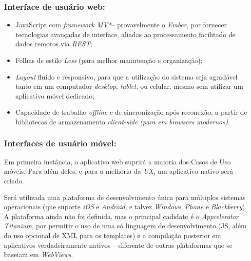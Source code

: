 \documentclass[a4paper]{abnt}
\begin{document}
\subsubsection{Interface de usuário web:}
\begin{itemize}
	\item JavaScript com \emph{framework MV*}\footnotemark -- provavelmente o \emph{Ember}, por fornecer tecnologias avançadas de interface, aliadas ao processamento facilitado de dados remotos via \emph{REST};
			
	\item Folhas de estilo \emph{Less}\footnotemark{} (para melhor manutenção e organização);
			
	\item \emph{Layout} fluido e responsivo, para que a utilização do sistema seja agradável tanto em um computador \emph{desktop}, \emph{tablet}, ou celular, mesmo sem utilizar um aplicativo móvel \mbox{dedicado};
		
	\item Capacidade de trabalho \emph{offline} e de sincronização após reconexão, a partir de bibliotecas de armazenamento \emph{client-side} \emph{(para em browsers modernos)}.
\end{itemize}

\subsubsection{Interfaces de usuário móvel:}
Em primeira instância, o aplicativo web suprirá a maioria dos Casos de Uso móveis. Para além deles, e para a melhoria da \emph{UX}\footnotemark, um aplicativo nativo será criado.
	
Será utilizada uma plataforma de desenvolvimento única para múltiplos sistemas operacionais (que suporte \emph{iOS} e \emph{Android}, e talvez \emph{Windows~Phone} e \emph{Blackberry}). A plataforma ainda não foi definida, mas o principal cadidato é o \emph{Appcelerator Titanium}, por permitir o uso de uma só linguagem de desenvolvimento (JS, além do uso opcional de XML para os templates) e a compilação posterior em aplicativos verdadeiramente nativos -- diferente de outras plataformas que se baseiam em \emph{WebViews}.	
\end{document}
